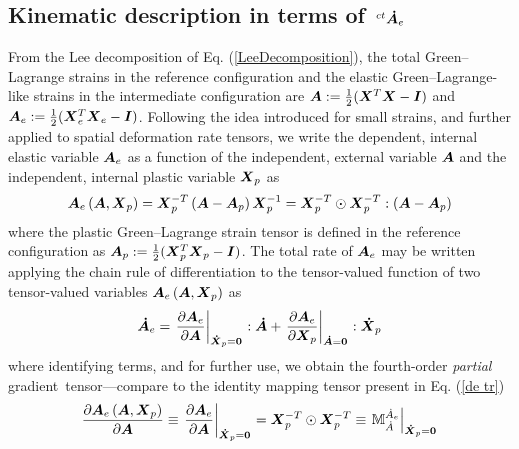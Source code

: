\documentclass[preprint,review,12pt,sort&compress]{elsarticle}%
\newcommand{\xpdo}[0]{\scriptsize\mathbf{\dot X}_p = \mathbf{0}\normalsize\mathbf{}}
\newcommand{\ado}[0]{\scriptsize\mathbf{\dot A} = \mathbf{0}\normalsize\mathbf{}}
\renewcommand{\mathbf}[1]{\mbox{\boldmath $#1$ \unboldmath}  \!\!}
\begin{document}
\subsection{Kinematic description in terms of $\,^{ct}\mathbf{\dot{A}}_{e}$}

From the Lee decomposition of Eq. (\ref{LeeDecomposition}), the total
Green--Lagrange strains in the reference configuration and the elastic
Green--Lagrange-like strains in the intermediate configuration are
$\mathbf{A}:=\frac{1}{2}(\mathbf{X}^{T}\mathbf{X}-\mathbf{I})$ and
$\mathbf{A}_{e}:=\frac{1}{2}(\mathbf{X}_{e}^{T}\mathbf{X}_{e}-\mathbf{I})$.
Following the idea introduced for small strains, and further applied to
spatial deformation rate tensors, we write the dependent, internal elastic
variable $\mathbf{A}_{e}$ as a function of the independent, external variable
$\mathbf{A}$ and the independent, internal plastic variable $\mathbf{X}_{p}$
as%
\begin{equation}
\mathbf{A}_{e}\left(  \mathbf{A},\mathbf{X}_{p}\right)  =\mathbf{X}_{p}%
^{-T}\left(  \mathbf{A}-\mathbf{A}_{p}\right)  \mathbf{X}_{p}^{-1}%
=\mathbf{X}_{p}^{-T}\odot\mathbf{X}_{p}^{-T}:\left(  \mathbf{A}-\mathbf{A}%
_{p}\right)  \label{Ae(A,Xp)}%
\end{equation}
where the plastic Green--Lagrange strain tensor is defined in the reference
configuration as $\mathbf{A}_{p}:=\frac{1}{2}(\mathbf{X}_{p}^{T}\mathbf{X}%
_{p}-\mathbf{I})$. The total rate of $\mathbf{A}_{e}$ may be written applying
the chain rule of differentiation to the tensor-valued function of two
tensor-valued variables $\mathbf{A}_{e}\left(  \mathbf{A},\mathbf{X}%
_{p}\right)  $ as%
\begin{equation}
\mathbf{\dot{A}}_{e}=\left.  \frac{\partial\mathbf{A}_{e}}{\partial\mathbf{A}%
}\right\vert _{%
\xpdo
}:\mathbf{\dot{A}}+\left.  \frac{\partial\mathbf{A}_{e}}{\partial
\mathbf{X}_{p}}\right\vert _{%
\ado
}:\mathbf{\dot{X}}_{p} \label{Aedot}%
\end{equation}
where identifying terms, and for further use, we obtain the fourth-order
\emph{partial} gradient\ tensor---compare to the identity mapping tensor
present in Eq. (\ref{de tr})%
\begin{equation}
\frac{\partial\mathbf{A}_{e}\left(  \mathbf{A},\mathbf{X}_{p}\right)
}{\partial\mathbf{A}}\equiv\left.  \frac{\partial\mathbf{A}_{e}}%
{\partial\mathbf{A}}\right\vert _{%
\xpdo
}=\mathbf{X}_{p}^{-T}\odot\mathbf{X}_{p}^{-T}\equiv\left.  \mathbb{M}_{\dot
{A}}^{\dot{A}_{e}}\right\vert _{%
\xpdo
} \label{dAe/dA _Xpdot=0}%
\end{equation}
\end{document}
